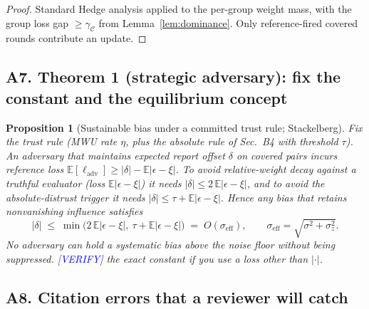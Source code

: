 \documentclass[11pt]{article}
\newtheorem{proposition}{Proposition}
\theoremstyle{definition}
\theoremstyle{remark}
\newcommand{\Cov}{\mathcal{C}}
\newcommand{\E}{\mathbb{E}}
\begin{document}
\begin{proof}[Proof]
Standard Hedge analysis \citep{freund1997,arora2012mwu} applied to the per-group weight mass, with
the group loss gap $\ge\gamma_{\Cov}$ from Lemma~\ref{lem:dominance}. Only reference-fired covered
rounds contribute an update.
\end{proof}

\subsection*{A7. Theorem 1 (strategic adversary): fix the constant and the equilibrium concept}

\begin{proposition}[Sustainable bias under a committed trust rule; Stackelberg]
\label{prop:stackelberg}
Fix the trust rule (MWU rate $\eta$, plus the absolute rule of Sec.~B4 with threshold $\tau$).
An adversary that maintains expected report offset $\delta$ on covered pairs incurs reference loss
$\E[\ell_{\mathrm{adv}}]\ge |\delta|-\E|\epsilon-\xi|$. To avoid relative-weight decay against a
truthful evaluator (loss $\E|\epsilon-\xi|$) it needs
$|\delta|\le 2\,\E|\epsilon-\xi|$, and to avoid the absolute-distrust trigger it needs
$|\delta|\le \tau+\E|\epsilon-\xi|$. Hence any bias that retains nonvanishing influence satisfies
\[
|\delta|\;\le\;\min\!\big(2\,\E|\epsilon-\xi|,\ \tau+\E|\epsilon-\xi|\big)\;=\;O(\sigma_{\mathrm{eff}}),
\qquad \sigma_{\mathrm{eff}}=\sqrt{\sigma^2+\sigma_z^2}.
\]
No adversary can hold a systematic bias above the noise floor without being suppressed.
\textcolor{blue}{[VERIFY]} the exact constant if you use a loss other than $|\cdot|$.
\end{proposition}

\subsection*{A8. Citation errors that a reviewer will catch}
\end{document}
